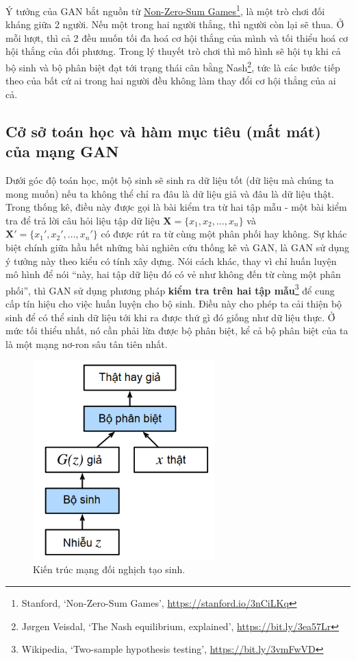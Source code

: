 \documentclass[a4paper, 12pt]{report}
\begin{document}
Ý tưởng của GAN bắt nguồn từ \href{https://cs.stanford.edu/people/eroberts/courses/soco/projects/1998-99/game-theory/nonzero.html}{Non-Zero-Sum Games}\footnote{Stanford, \lq Non-Zero-Sum Games\rq, \href{https://stanford.io/3nCiLKq}{https://stanford.io/3nCiLKq}}, là một trò chơi đối kháng giữa 2 người.
Nếu một trong hai người thắng, thì người còn lại sẽ thua.
Ở mỗi lượt, thì cả 2 đều muốn tối đa hoá cơ hội thắng của mình và tối thiểu hoá cơ hội thắng của đối phương.
Trong lý thuyết trò chơi thì mô hình sẽ hội tụ khi cả bộ sinh và bộ phân biệt đạt tới trạng thái cân bằng Nash\footnote{Jørgen Veisdal, \lq The Nash equilibrium, explained\rq, \href{https://bit.ly/3ea57Lr}{https://bit.ly/3ea57Lr}}, tức là các bước tiếp theo của bất cứ ai trong hai người đều không làm thay đổi cơ hội thẳng của ai cả.

\subsection{Cở sở toán học và hàm mục tiêu (mất mát) của mạng GAN}

Dưới góc độ toán học, một bộ sinh sẽ sinh ra dữ liệu tốt (dữ liệu mà chúng ta mong muốn) nếu ta không thể chỉ ra đâu là dữ liệu giả và đâu là dữ liệu thật.
Trong thống kê, điều này được gọi là bài kiểm tra từ hai tập mẫu - một bài kiểm tra để trả lời câu hỏi liệu tập dữ liệu $\bm{X} = \{x_1, x_2, \dots, x_n\}$ và $\bm{X'}=\{x_1', x_2', \dots, x_n'\}$ có được rút ra từ cùng một phân phối hay không.
Sự khác biệt chính giữa hầu hết những bài nghiên cứu thống kê và GAN, là GAN sử dụng ý tưởng này theo kiểu có tính xây dựng.
Nói cách khác, thay vì chỉ huấn luyện mô hình để nói ``này, hai tập dữ liệu đó có vẻ như không đến từ cùng một phân phối'', thì GAN sử dụng phương pháp \textbf{kiểm tra trên hai tập mẫu}\footnote{Wikipedia, \lq Two-sample hypothesis testing\rq, \href{https://bit.ly/3vmFwVD}{https://bit.ly/3vmFwVD}} để cung cấp tín hiệu cho việc huấn luyện cho bộ sinh.
Điều này cho phép ta cải thiện bộ sinh để có thể sinh dữ liệu tới khi ra được thứ gì đó giống như dữ liệu thực.
Ở mức tối thiểu nhất, nó cần phải lừa được bộ phân biệt, kể cả bộ phân biệt của ta là một mạng nơ-ron sâu tân tiên nhất.

\begin{figure}[!h]
\captionsetup{width=0.8\textwidth}
\centering
\includegraphics[width=7cm]{images/2_71.PNG}
\caption{Kiến trúc mạng đối nghịch tạo sinh.}
\label{fig:architectsimplegan}
\end{figure}
\end{document}
